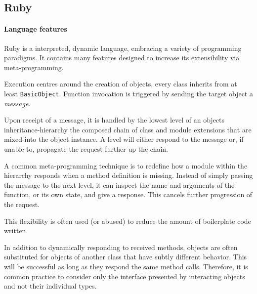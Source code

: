 \subsection{Ruby}
\paragraph*{Language features}
Ruby\cite{rubylang} is a interpreted, dynamic language, embracing a variety of programming paradigms. It contains many features designed to increase its extensibility via meta-programming.

Execution centres around the creation of objects, every class inherits from at least \verb|BasicObject|. Function invocation is triggered by sending the target object a \emph{message}.

Upon receipt of a message, it is handled by the lowest level of an objects inheritance-hierarchy \textemdash{} the composed chain of class and module extensions that are mixed-into the object instance. A level will either respond to the message or, if unable to, propagate the request further up the chain.

A common meta-programming technique is to redefine how a module within the hierarchy responds when a method definition is missing. Instead of simply passing the message to the next level, it can inspect the name and arguments of the function, or its own state, and give a response. This cancels further progression of the request.

\begin{comment}
\begin{lstlisting}[
  language=Ruby,
  label=lst:methmiss,
  caption=A toy example where an object responds to a missing method instead of propagating the message.
]
class HungryHippo
  def eat
    puts "Nom nom nom!"
  end

  def method_missing(meth, *args, &block)
    if /eat/.match meth.to_s
      puts "Eat? ok then."
      eat
    else
      super
    end
  end
end

hippo = HungryHippo.new
hippo.eat
hippo.dont_eat
# >> Nom nom nom!
# >> Eat? ok then.
# >> Nom nom nom!
\end{lstlisting}
\end{comment}

This flexibility is often used (or abused) to reduce the amount of boilerplate code written.

In addition to dynamically responding to received methods, objects are often substituted for objects of another class that have subtly different behavior. This will be successful as long as they respond the same method calls. Therefore, it is common practice to consider only the interface presented by interacting objects and not their individual types.

